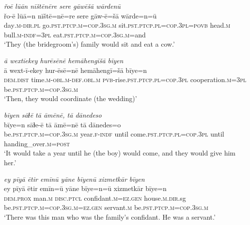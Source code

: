 \ea \label{RE.13}
\textit{řoē lūān nīštēnēre sere gāwēšā wārdenū} \\ 
\gll řo-ē lūā=n nīštē=nē=re sere gāw-ē=šā wārde=n=ū \\ 
 day\textsc{.m}\textsc{-dir}\textsc{.pl} go\textsc{.pst}\textsc{.ptcp}\textsc{.m}\textsc{=cop}\textsc{.3sg}\textsc{.m} sit\textsc{.pst}\textsc{.ptcp}\textsc{.pl}\textsc{=cop}\textsc{.3pl}\textsc{=\textsc{povb}} head\textsc{.m} bull\textsc{.m}\textsc{-indf}\textsc{=3pl} eat\textsc{.pst}\textsc{.ptcp}\textsc{.m}\textsc{=cop}\textsc{.3sg}\textsc{.m}=and \\ 
\glt `They (the bridegroom’s) family would sit and eat a cow.'
\z 
 
\ea \label{RE.14}
\textit{ā wextīekey hurēsēnē hemāhengīšā bīyen} \\ 
\gll ā wext-ī-ekey hur-ēsē=nē hemāhengī=šā bīye=n \\ 
 \textsc{dem.dist} time\textsc{.m}\textsc{-obl}\textsc{.m}\textsc{-def}\textsc{.obl}\textsc{.m} \textsc{pvb-}rise\textsc{.pst}\textsc{.ptcp}\textsc{.pl}\textsc{=cop}\textsc{.3pl} cooperation\textsc{.m}\textsc{=3pl} be\textsc{.pst}\textsc{.ptcp}\textsc{.m}\textsc{=cop}\textsc{.3sg}\textsc{.m} \\ 
\glt `Then, they would coordinate (the wedding)'
\z 
 
\ea \label{RE.15}
\textit{bīyen sāɫē tā āmēnē, tā dānedeso} \\ 
\gll bīye=n sāɫe-ē tā āmē=nē tā dānedes=o \\ 
 be\textsc{.pst}\textsc{.ptcp}\textsc{.m}\textsc{=cop}\textsc{.3sg}\textsc{.m} year\textsc{.f}\textsc{-indf} until come\textsc{.pst}\textsc{.ptcp}\textsc{.pl}\textsc{=cop}\textsc{.3pl} until handing\_over\textsc{.m}\textsc{=\textsc{post}} \\ 
\glt `It would take a year until he (the boy) would come, and they would give him her.'
\z 
 
\ea \label{RE.16}
\textit{ey pīyā ētir emīnū yāne bīyenū xizmetkār bīyen} \\ 
\gll ey pīyā ētir emīn=ū yāne bīye=n=ū xizmetkār bīye=n \\ 
 \textsc{dem.prox} man\textsc{.m} \textsc{disc.ptcl} confidant\textsc{.m}\textsc{=ez.gen} house\textsc{.m}\textsc{.dir}.sg be\textsc{.pst}\textsc{.ptcp}\textsc{.m}\textsc{=cop}\textsc{.3sg}\textsc{.m}\textsc{=ez.gen} servant\textsc{.m} be\textsc{.pst}\textsc{.ptcp}\textsc{.m}\textsc{=cop}\textsc{.3sg}\textsc{.m} \\ 
\glt `There was this man who was the family’s confidant. He was a servant.'
\z 
 
